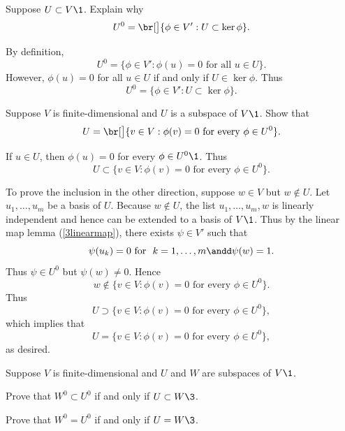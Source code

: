 \exercise
Suppose $U \subset V\1$. Explain why
\[
U^0 = \br[\big]{\phi \in V': U \subset \ker \phi}.
\]
\exercisedisplayend

\begin{Solution}
By definition,
\[
U^0 = \{\phi \in V': \phi(u) = 0 \text{\ for all\ } u \in U\}.
\]
However, $\phi(u) = 0$ for all $u \in U$ if and only if $U \in \ker \phi$. Thus
\[
U^0 = \{\phi \in V': U \subset \ker \phi\}.
\]
\end{Solution}

\exercise
Suppose $V$ is finite-dimensional and $U$ is a subspace of $V\1$. Show that\label{3Uan}
\[
U = \br[\big]{v \in V: \phi(v) = 0 \text{\ for every\ } \phi \in U^0}.
\]
\exercisedisplayend

\begin{Solution}
If $u \in U$, then $\phi(u) = 0$ for every $\phi \in U^0\1$. Thus
\[
U \subset \{v \in V: \phi(v) = 0 \text{\ for every\ } \phi \in U^0\}.
\]

To prove the inclusion in the other direction, suppose $w \in V$ but $w \notin U$. Let $u_1, \dots, u_m$ be a basis of $U$. Because $w \notin U$, the list $u_1, \dots, u_m, w$ is linearly independent and hence can be extended to a basis of $V\1$. Thus by the linear map lemma (\ref{3linearmap}), there exists $\psi \in V'$ such that
\[
\psi(u_k) = 0 \text{\ for \ } k = 1, \dots, m \andd \psi(w) = 1.
\]
Thus $\psi \in U^0$ but $\psi(w) \ne 0$. Hence
\[
w \notin \{v \in V: \phi(v) = 0 \text{\ for every\ } \phi \in U^0\}.
\]
Thus
\[
U \supset \{v \in V: \phi(v) = 0 \text{\ for every\ } \phi \in U^0\},
\]
which implies that
\[
U = \{v \in V: \phi(v) = 0 \text{\ for every\ } \phi \in U^0\},
\]
as desired.
\end{Solution}

\exercise
Suppose $V$ is finite-dimensional and $U$ and $W$ are subspaces of $V\1$.
\begin{subtheorem}
\item
Prove that $W^0 \subset U^0$ if and only if $U \subset W\3$.
\item
Prove that $W^0 = U^0$ if and only if $U = W\3$.
\end{subtheorem}
\exercisesubtheoremend


